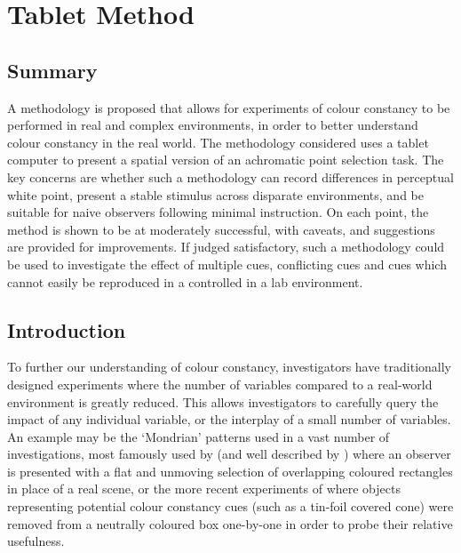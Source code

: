\chapter{Tablet Method}
\label{TabletMethodChapter}

\section{Summary}

A methodology is proposed that allows for experiments of colour constancy to be performed in real and complex environments, in order to better understand colour constancy in the real world. The methodology considered uses a tablet computer to present a spatial version of an achromatic point selection task. 
The key concerns are whether such a methodology can record differences in perceptual white point, present a stable stimulus across disparate environments, and be suitable for naive observers following minimal instruction. On each point, the method is shown to be at moderately successful, with caveats, and suggestions are provided for improvements.
If judged satisfactory, such a methodology could be used to investigate the effect of multiple cues, conflicting cues and cues which cannot easily be reproduced in a controlled in a lab environment.

\section{Introduction}

To further our understanding of colour constancy, investigators have traditionally designed experiments where the number of variables compared to a real-world environment is greatly reduced. This allows investigators to carefully query the impact of any individual variable, or the interplay of a small number of variables. An example may be the `Mondrian' patterns used in a vast number of investigations, most famously used by \citet{land_retinex_1964} (and well described by \citet{hurlbert_colour_1999}) where an observer is presented with a flat and unmoving selection of overlapping coloured rectangles in place of a real scene, or the more recent experiments of \citet{kraft_mechanisms_1999} where objects representing potential colour constancy cues (such as a tin-foil covered cone) were removed from a neutrally coloured box one-by-one in order to probe their relative usefulness.

